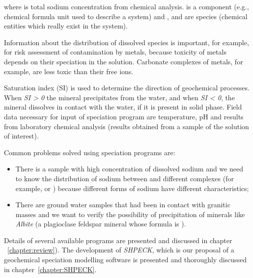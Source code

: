where  is total sodium concentration from chemical analysis.  is a component (e.g., chemical formula unit used to describe a system) and ,  and  are species (chemical entities which really exist in the system). 

Information about the distribution of dissolved species is important, for example, for risk assessment of contamination by metals, because toxicity of metals depends on their speciation in the solution. Carbonate complexes of metals, for example, are less toxic than their free ions.

Saturation index (SI) is used to determine the direction of geochemical processes. When \emph{SI > 0} the mineral precipitates from the water, and when \emph{SI < 0}, the mineral dissolves in contact with the water, if it is present in solid phase. Field data necessary for input of speciation program are temperature, pH and results from laboratory chemical analysis (results obtained from a sample of the solution of interest).

Common problems solved using speciation programs are: 
\begin{itemize}
\item There is a sample with high concentration of dissolved sodium and we need to know the distribution of sodium between  and different complexes (for example,  or ) because different forms of sodium have different characteristics;
\item There are ground water samples that had been in contact with granitic masses and we want to verify the possibility of precipitation of minerals like \emph{Albite} (a plagioclase feldspar mineral whose formula is \emph{}).
\end{itemize}

Details of several available programs are presented and discussed in chapter ~\ref{chapter:review}). The development of \emph{SHPECK}, which is our proposal of a geochemical speciation modelling software is presented and thoroughly discussed in chapter~\ref{chapter:SHPECK}. 

